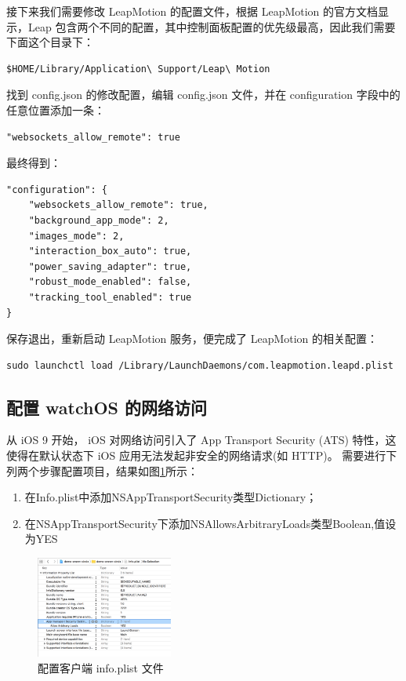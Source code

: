 接下来我们需要修改 LeapMotion 的配置文件，根据 LeapMotion 的官方文档显示，Leap 包含两个不同的配置，其中控制面板配置的优先级最高，因此我们需要下面这个目录下：
\begin{lstlisting}[frame=trBL,frameround=fttt,rulesepcolor=\color{white},numbers=none]
$HOME/Library/Application\ Support/Leap\ Motion
\end{lstlisting}

找到 config.json 的修改配置，编辑 config.json 文件，并在 configuration 字段中的任意位置添加一条：
\begin{lstlisting}[frame=trBL,frameround=fttt,rulesepcolor=\color{white},numbers=none]
"websockets_allow_remote": true
\end{lstlisting}

最终得到：

\begin{lstlisting}[frame=trBL,frameround=fttt,rulesepcolor=\color{white},numbers=none]
"configuration": {
    "websockets_allow_remote": true,
    "background_app_mode": 2,
    "images_mode": 2,
    "interaction_box_auto": true,
    "power_saving_adapter": true,
    "robust_mode_enabled": false,
    "tracking_tool_enabled": true
}
\end{lstlisting}

保存退出，重新启动 LeapMotion 服务，便完成了 LeapMotion 的相关配置：

\begin{lstlisting}[frame=trBL,frameround=fttt,rulesepcolor=\color{white},numbers=none]
sudo launchctl load /Library/LaunchDaemons/com.leapmotion.leapd.plist
\end{lstlisting}

\subsection{配置 watchOS 的网络访问}

从 iOS 9 开始， iOS 对网络访问引入了 App Transport Security (ATS) 特性，这使得在默认状态下 iOS 应用无法发起非安全的网络请求(如 HTTP)。
需要进行下列两个步骤配置项目，结果如图\ref{fig:config}所示：

\begin{enumerate}
    \item 在Info.plist中添加NSAppTransportSecurity类型Dictionary；
    \item 在NSAppTransportSecurity下添加NSAllowsArbitraryLoads类型Boolean,值设为YES
\end{enumerate}

\begin{figure}[H]
    \kaishu
    \centering
    \includegraphics[width=0.4\textwidth]{figures/config}
    \caption{\kaishu 配置客户端 info.plist 文件}
    \label{fig:config}
\end{figure}

